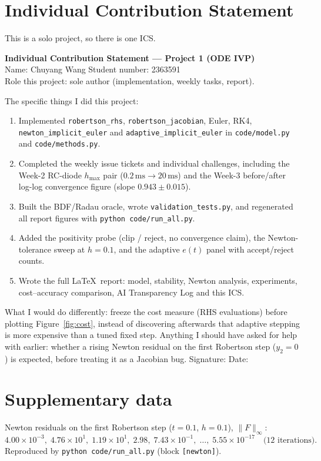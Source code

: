 \documentclass[11pt,a4paper]{article}
\begin{document}
\section{Individual Contribution Statement}
This is a solo project, so there is one ICS.

\noindent\textbf{Individual Contribution Statement --- Project 1 (ODE IVP)}\\
Name: Chuyang Wang \qquad Student number: 2363591\\
Role this project: sole author (implementation, weekly tasks, report).

The specific things I did this project:
\begin{enumerate}[leftmargin=1.2em]
  \item Implemented \texttt{robertson\_rhs}, \texttt{robertson\_jacobian}, Euler, RK4, \texttt{newton\_implicit\_euler} and \texttt{adaptive\_implicit\_euler} in \texttt{code/model.py} and \texttt{code/methods.py}.
  \item Completed the weekly issue tickets and individual challenges, including the Week-2 RC-diode \(h_{\max}\) pair (\(0.2\,\mathrm{ms}\to 20\,\mathrm{ms}\)) and the Week-3 before/after log-log convergence figure (slope \(0.943\pm 0.015\)).
  \item Built the BDF/Radau oracle, wrote \texttt{validation\_tests.py}, and regenerated all report figures with \texttt{python code/run\_all.py}.
  \item Added the positivity probe (clip / reject, no convergence claim), the Newton-tolerance sweep at \(h=0.1\), and the adaptive \(e(t)\) panel with accept/reject counts.
  \item Wrote the full \LaTeX\ report: model, stability, Newton analysis, experiments, cost--accuracy comparison, AI Transparency Log and this ICS.
\end{enumerate}
What I would do differently: freeze the cost measure (RHS evaluations) before plotting Figure~\ref{fig:cost}, instead of discovering afterwards that adaptive stepping is more expensive than a tuned fixed step.
Anything I should have asked for help with earlier: whether a rising Newton residual on the first Robertson step (\(y_2=0\)) is expected, before treating it as a Jacobian bug.
Signature: \underline{\hspace{4cm}} \quad Date: \underline{\hspace{3cm}}

\section{Supplementary data}
Newton residuals on the first Robertson step (\(t=0.1\), \(h=0.1\)), \(\|F\|_\infty\):
\[
4.00\times 10^{-3},\;
4.76\times 10^{1},\;
1.19\times 10^{1},\;
2.98,\;
7.43\times 10^{-1},\;
\ldots,\;
5.55\times 10^{-17}
\quad\text{(12 iterations).}
\]
Reproduced by \texttt{python code/run\_all.py} (block \texttt{[newton]}).
\end{document}

